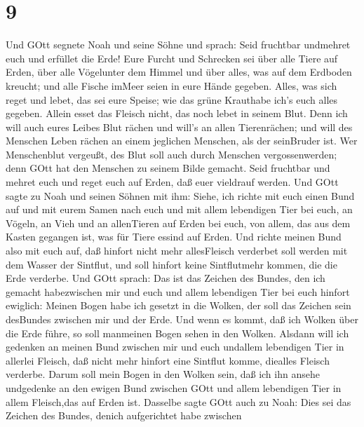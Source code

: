 \hypertarget{section-8}{%
\section{9}\label{section-8}}

 Und GOtt segnete Noah und seine Söhne und sprach: Seid
fruchtbar undmehret euch und erfüllet die Erde!  Eure Furcht
und Schrecken sei über alle Tiere auf Erden, über alle Vögelunter dem
Himmel und über alles, was auf dem Erdboden kreucht; und alle Fische
imMeer seien in eure Hände gegeben.  Alles, was sich reget
und lebet, das sei eure Speise; wie das grüne Krauthabe ich's euch alles
gegeben.  Allein esset das Fleisch nicht, das noch lebet in
seinem Blut.  Denn ich will auch eures Leibes Blut rächen
und will's an allen Tierenrächen; und will des Menschen Leben rächen an
einem jeglichen Menschen, als der seinBruder ist.  Wer
Menschenblut vergeußt, des Blut soll auch durch Menschen
vergossenwerden; denn GOtt hat den Menschen zu seinem Bilde gemacht.
 Seid fruchtbar und mehret euch und reget euch auf Erden,
daß euer vieldrauf werden.  Und GOtt sagte zu Noah und
seinen Söhnen mit ihm:  Siehe, ich richte mit euch einen
Bund auf und mit eurem Samen nach euch  und mit allem
lebendigen Tier bei euch, an Vögeln, an Vieh und an allenTieren auf
Erden bei euch, von allem, das aus dem Kasten gegangen ist, was für
Tiere essind auf Erden.  Und richte meinen Bund also mit
euch auf, daß hinfort nicht mehr allesFleisch verderbet soll werden mit
dem Wasser der Sintflut, und soll hinfort keine Sintflutmehr kommen, die
die Erde verderbe.  Und GOtt sprach: Das ist das Zeichen
des Bundes, den ich gemacht habezwischen mir und euch und allem
lebendigen Tier bei euch hinfort ewiglich:  Meinen Bogen
habe ich gesetzt in die Wolken, der soll das Zeichen sein desBundes
zwischen mir und der Erde.  Und wenn es kommt, daß ich
Wolken über die Erde führe, so soll manmeinen Bogen sehen in den Wolken.
 Alsdann will ich gedenken an meinen Bund zwischen mir und
euch undallem lebendigen Tier in allerlei Fleisch, daß nicht mehr
hinfort eine Sintflut komme, diealles Fleisch verderbe. 
Darum soll mein Bogen in den Wolken sein, daß ich ihn ansehe undgedenke
an den ewigen Bund zwischen GOtt und allem lebendigen Tier in allem
Fleisch,das auf Erden ist.  Dasselbe sagte GOtt auch zu
Noah: Dies sei das Zeichen des Bundes, denich aufgerichtet habe zwischen

